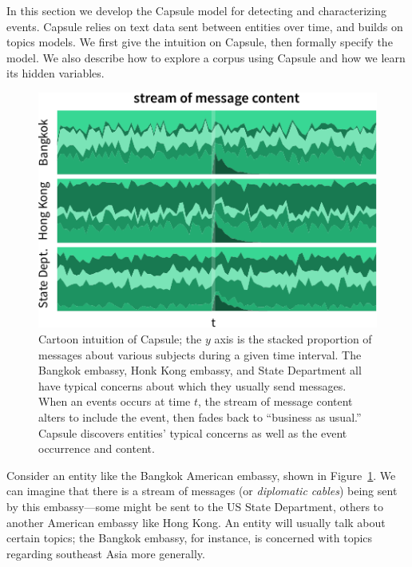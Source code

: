 
In this section we develop the Capsule model for detecting and characterizing events.  Capsule relies on text data sent between entities over time, and builds on topics models. We first give the intuition on Capsule, then formally specify the model.  We also describe how to explore a corpus using Capsule and how we learn its hidden variables.

\begin{figure}
\centering
\includegraphics[width=\linewidth]{fig/cartoon.pdf}
\caption{Cartoon intuition of Capsule; the $y$ axis is the stacked proportion of messages about various subjects during a given time interval.  The Bangkok embassy, Honk Kong embassy, and State Department all have typical concerns about which they usually send messages.  When an events occurs at time $t$, the stream of message content alters to include the event, then fades back to ``business as usual.''  Capsule discovers entities' typical concerns as well as the event occurrence and content.}
\label{fig:cartoon}
\end{figure}

Consider an entity like the Bangkok American embassy, shown in Figure~\ref{fig:cartoon}.  We can imagine that there is a stream of messages (or \emph{diplomatic cables}) being sent by this embassy---some might be sent to the US State Department, others to another American embassy like Hong Kong.  An entity will usually talk about certain topics; the Bangkok embassy, for instance, is concerned with topics regarding southeast Asia more generally.

